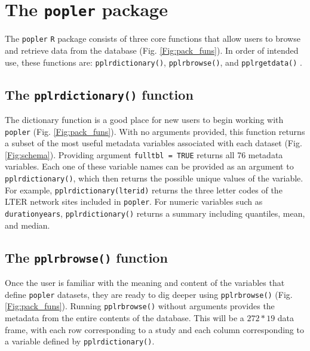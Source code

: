\documentclass{article}\usepackage[]{graphicx}\usepackage[]{color}
\newcommand{\tom}[1]{{\textit{\color{red}{[#1]}}}}
\begin{document}
\section*{The \texttt{popler} package}
The \texttt{popler} \texttt{R} package consists of three core functions that allow users to browse and retrieve data from the database (Fig. \ref{Fig:pack_funs}). In order of intended use, these functions are: \texttt{pplr\textunderscore dictionary()}, \texttt{pplr\textunderscore browse()}, and \texttt{pplr\textunderscore get\textunderscore data()} \tom{I would be in favor of adding the `o' and `e' to make it `popler\textunderscore browse()' etc.}. 

\subsection*{The \texttt{pplr\textunderscore dictionary()} function}
The dictionary function is a good place for new users to begin working with \texttt{popler} (Fig. \ref{Fig:pack_funs}). With no arguments provided, this function returns a subset of the most useful metadata variables associated with each  dataset (Fig. \ref{Fig:schema}). Providing argument \texttt{full\textunderscore tbl = TRUE} returns all 76 metadata variables. Each one of these variable names can be provided as an argument to \texttt{pplr\textunderscore dictionary()}, which then returns the possible unique values of the variable. For example, \texttt{pplr\textunderscore dictionary(lterid)} returns the three letter codes of the LTER network sites included in \texttt{popler}. For numeric variables such as \texttt{duration\textunderscore years}, \texttt{pplr\textunderscore dictionary()} returns a summary including quantiles, mean, and median. 

\subsection*{The \texttt{pplr\textunderscore browse()} function}
Once the user is familiar with the meaning and content of the variables that define \texttt{popler} datasets, they are ready to dig deeper using \texttt{pplr\textunderscore browse()} (Fig. \ref{Fig:pack_funs}). Running \texttt{pplr\textunderscore browse()} without arguments provides the metadata from the entire contents of the database. This will be a $272 * 19$ data frame, with each row corresponding to a study and each column corresponding to a variable defined by \texttt{pplr\textunderscore dictionary()}.
\end{document}
